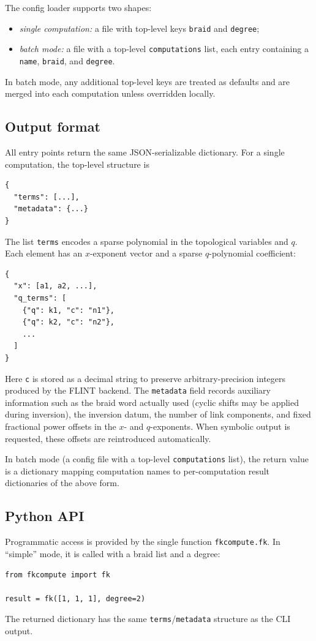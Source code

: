 \documentclass[twocolumn]{article}
\begin{document}
The config loader supports two shapes:
\begin{itemize}
  \item \emph{single computation:} a file with top-level keys \texttt{braid} and
    \texttt{degree};
  \item \emph{batch mode:} a file with a top-level \texttt{computations} list,
    each entry containing a \texttt{name}, \texttt{braid}, and \texttt{degree}.
\end{itemize}
In batch mode, any additional top-level keys are treated as defaults and are
merged into each computation unless overridden locally.

\subsection{Output format}

All entry points return the same JSON-serializable dictionary.
For a single computation, the top-level structure is
\begin{verbatim}
{
  "terms": [...],
  "metadata": {...}
}
\end{verbatim}
The list \texttt{terms} encodes a sparse polynomial in the topological
variables and $q$.  Each element has an $x$-exponent vector and a sparse
$q$-polynomial coefficient:
\begin{verbatim}
{ 
  "x": [a1, a2, ...],
  "q_terms": [
    {"q": k1, "c": "n1"},
    {"q": k2, "c": "n2"},
    ...
  ]
}
\end{verbatim}
Here \texttt{c} is stored as a decimal string to preserve arbitrary-precision
integers produced by the FLINT backend.
The \texttt{metadata} field records auxiliary information such as the braid word
actually used (cyclic shifts may be applied during inversion), the inversion
datum, the number of link components, and fixed fractional power offsets in the
$x$- and $q$-exponents.  When symbolic output is requested, these offsets are
reintroduced automatically.

In batch mode (a config file with a top-level \texttt{computations} list), the
return value is a dictionary mapping computation names to per-computation result
dictionaries of the above form.

\subsection{Python API}

Programmatic access is provided by the single function \texttt{fkcompute.fk}.
In ``simple'' mode, it is called with a braid list and a degree:
\begin{verbatim}
from fkcompute import fk

result = fk([1, 1, 1], degree=2)
\end{verbatim}
The returned dictionary has the same \texttt{terms}/\texttt{metadata} structure as
the CLI output.
\end{document}
